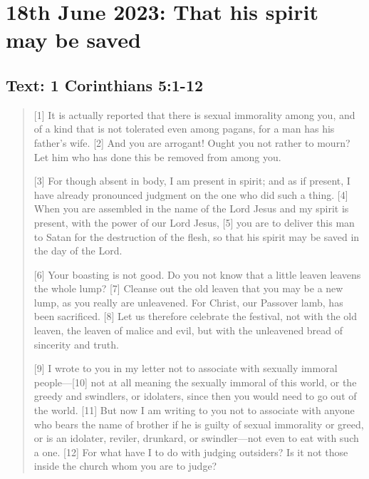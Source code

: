 \setcounter{figure}{0}

\section{18th June 2023: That his spirit may be saved}
\subsection*{Text: 1 Corinthians 5:1-12}
  \begin{quote}
    [1] It is actually reported that there is sexual immorality among you, and of a kind that is not tolerated even among pagans, for a man has his father’s wife. [2] And you are arrogant! Ought you not rather to mourn? Let him who has done this be removed from among you.

    [3] For though absent in body, I am present in spirit; and as if present, I have already pronounced judgment on the one who did such a thing. [4] When you are assembled in the name of the Lord Jesus and my spirit is present, with the power of our Lord Jesus, [5] you are to deliver this man to Satan for the destruction of the flesh, so that his spirit may be saved in the day of the Lord.

    [6] Your boasting is not good. Do you not know that a little leaven leavens the whole lump? [7] Cleanse out the old leaven that you may be a new lump, as you really are unleavened. For Christ, our Passover lamb, has been sacrificed. [8] Let us therefore celebrate the festival, not with the old leaven, the leaven of malice and evil, but with the unleavened bread of sincerity and truth.

    [9] I wrote to you in my letter not to associate with sexually immoral people—[10] not at all meaning the sexually immoral of this world, or the greedy and swindlers, or idolaters, since then you would need to go out of the world. [11] But now I am writing to you not to associate with anyone who bears the name of brother if he is guilty of sexual immorality or greed, or is an idolater, reviler, drunkard, or swindler—not even to eat with such a one. [12] For what have I to do with judging outsiders? Is it not those inside the church whom you are to judge?
  \end{quote}
